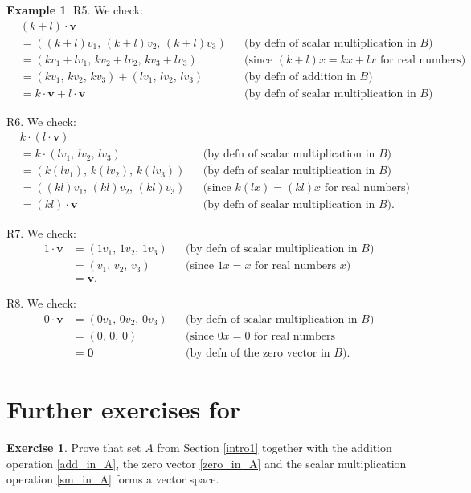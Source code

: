 \documentclass[a4paper,11pt]{book}
\theoremstyle{definition}
\newtheorem{exercise}{Exercise}
\newtheorem{example_environment}{Example}[chapter]
\newcommand{\ve}[1]{\mathbf{#1}}
\newcommand{\furtherexercises}{\section*{Further exercises for \thesection}}
\newenvironment{example}
	{
		\begin{oframed} 
		\begin{example_environment}
	}
	{
		\end{example_environment}
		\end{oframed}
	}
\begin{document}
\begin{example}
\noindent R5. We check:
\begin{align*}
  & (k + l) \cdot \ve{v} \\
  &= ( (k+l) v_1, \, (k+l) v_2,  \, (k+l) v_3) && \mbox{(by defn of scalar multiplication in $B$)} \\
  &= (kv_1 + lv_1, \, kv_2 + lv_2, \, kv_3 + lv_3) && \mbox{(since $(k+l)x = kx + lx$ for real numbers)} \\
  &= (kv_1, \, kv_2, \, kv_3) + (lv_1, \, lv_2, \, lv_3) && \mbox{(by defn of addition in $B$)} \\
  &= k \cdot \ve{v} + l \cdot \ve{v} && \mbox{(by defn of scalar multiplication in $B$)}
\end{align*} 

\noindent R6. We check:
\begin{align*}
  & k \cdot (l \cdot \ve{v}) \\
  &= k \cdot (l v_1, \, l v_2, \, lv_3) && \mbox{(by defn of scalar multiplication in $B$)} \\ 
  &= (k (lv_1), \, k (lv_2), \, k (lv_3)) && \mbox{(by defn of scalar multiplication in $B$)} \\
  &= ( (kl) v_1, \, (kl) v_2, \, (kl) v_3) && \mbox{(since $k(lx) = (kl)x$ for real numbers)} \\
  &= (kl) \cdot \ve{v} && \mbox{(by defn of scalar multiplication in $B$)}. 
 \end{align*} 

\noindent R7. We check:
\begin{align*}
 1 \cdot \ve{v} &= (1v_1, \, 1v_2, \, 1v_3) && \mbox{(by defn of scalar multiplication in $B$)} \\
 &= (v_1, \, v_2, \, v_3) && \mbox{(since $1 x = x$ for real numbers $x$)} \\
 &= \ve{v}.
 \end{align*}
 
\noindent R8. We check:
\begin{align*}
 0 \cdot \ve{v} &= (0v_1, \, 0v_2, \, 0v_3) && \mbox{(by defn of scalar multiplication in $B$)} \\
 &= (0, \, 0, \, 0) && \mbox{(since $0 x = 0$ for real numbers} \\
 &= \ve{0} && \mbox{(by defn of the zero vector in $B$)}.
 \end{align*}
\end{example}

\furtherexercises

\begin{exercise} Prove that set $A$ from Section \ref{intro1} together with the addition operation \eqref{add_in_A}, the zero vector \eqref{zero_in_A} and the scalar multiplication operation \eqref{sm_in_A} forms a vector space.
\end{exercise}
\end{document}

